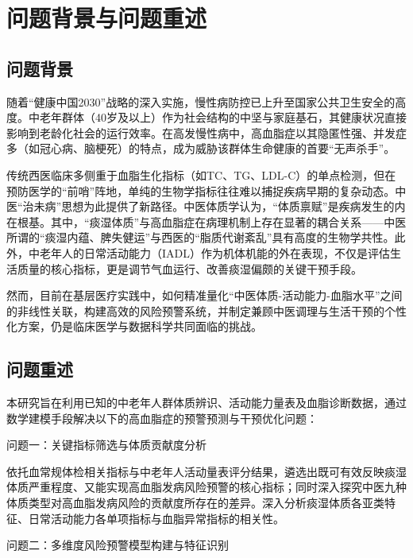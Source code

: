 \documentclass[12pt,a4paper]{ctexart}
\begin{document}
\newpage %

\pagestyle{empty}
\tableofcontents
\newpage

\pagestyle{plain}
\setcounter{page}{1}

\section{问题背景与问题重述}
\subsection{问题背景}
随着“健康中国2030”战略的深入实施，慢性病防控已上升至国家公共卫生安全的高度\cite{CentralCommittee2016}。中老年群体（40岁及以上）作为社会结构的中坚与家庭基石，其健康状况直接影响到老龄化社会的运行效率。在高发慢性病中，高血脂症以其隐匿性强、并发症多（如冠心病、脑梗死）的特点，成为威胁该群体生命健康的首要“无声杀手”。    \cite{Wang2022}

传统西医临床多侧重于血脂生化指标（如TC、TG、LDL-C）的单点检测，但在预防医学的“前哨”阵地，单纯的生物学指标往往难以捕捉疾病早期的复杂动态。中医“治未病”思想为此提供了新路径。中医体质学认为，“体质禀赋”是疾病发生的内在根基。其中，“痰湿体质”与高血脂症在病理机制上存在显著的耦合关系——中医所谓的“痰湿内蕴、脾失健运”与西医的“脂质代谢紊乱”具有高度的生物学共性\cite{Tan2018}。此外，中老年人的日常活动能力（IADL）作为机体机能的外在表现，不仅是评估生活质量的核心指标，更是调节气血运行、改善痰湿偏颇的关键干预手段。

然而，目前在基层医疗实践中，如何精准量化“中医体质-活动能力-血脂水平”之间的非线性关联，构建高效的风险预警系统，并制定兼顾中医调理与生活干预的个性化方案，仍是临床医学与数据科学共同面临的挑战。\cite{Lobach2024}
\subsection{问题重述}
本研究旨在利用已知的中老年人群体质辨识、活动能力量表及血脂诊断数据，通过数学建模手段解决以下的高血脂症的预警预测与干预优化问题：

问题一：关键指标筛选与体质贡献度分析

依托血常规体检相关指标与中老年人活动量表评分结果，遴选出既可有效反映痰湿体质严重程度、又能实现高血脂发病风险预警的核心指标；同时深入探究中医九种体质类型对高血脂发病风险的贡献度所存在的差异。深入分析痰湿体质各亚类特征、日常活动能力各单项指标与血脂异常指标的相关性。

问题二：多维度风险预警模型构建与特征识别
\end{document}
